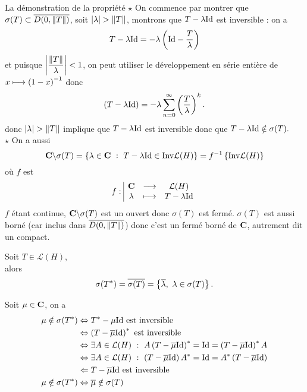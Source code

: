 \documentclass[a4paper,11pt, twoside]{article}
\begin{document}
\begin{ProofC}{La démonstration de la propriété}
  $\star$ On commence par montrer que $\sigma(T)\subset \overline{D(0,\left\lVert T\right\rVert)}$, soit $\abs{\lambda}>\norm{T}$, montrons que $T-\lambda \mathrm{Id}$ est inversible : on a 
  $$T-\lambda\mathrm{Id}=-\lambda\left(\mathrm{Id}-\frac{T}{\lambda}\right)$$
  et puisque $\displaystyle\left| \frac{\left\lVert T\right\rVert}{\lambda}\right|<1$, on peut utiliser le développement en série entière de $\displaystyle x\longmapsto\left(1-x\right)^{-1}$
  donc 
  $$\left(T-\lambda\mathrm{Id}\right)=-\lambda\sum_{n=0}^\infty\left(\frac{T}{\lambda}\right)^k.$$
  donc $\abs{\lambda}>\norm{T}$ implique que $T-\lambda \mathrm{Id}$ est inversible donc que $T-\lambda\mathrm{Id}\notin\sigma(T).$\\

  $\star$ On a aussi 
  $$\C\backslash\sigma(T)=\ens{\lambda\in\C\ :\ T-\lambda\Id\in\mathrm{Inv}\mathcal L(H)}=f^{-1}\ens{\mathrm{Inv}\mathcal L(H)}$$
  où $f$ est 
  $$f:\begin{array}{|ccc}
    \mathbf C&\longrightarrow&\mathcal L(H)\\
    \lambda&\longmapsto&T-\lambda\mathrm{Id}
  \end{array}$$
  $f$ étant continue, $\mathbf C\backslash\sigma(T)$ est un ouvert donc $\sigma(T)$ est fermé. $\sigma(T)$ est aussi borné (car inclus dans $\overline{D(0,\left\lVert T\right\rVert)}$) donc c'est un fermé borné de $\mathbf C$, autrement dit un compact.
\end{ProofC}


\begin{prop}
  Soit $T\in\mathcal L(H)$,\\

  alors 
  $$\sigma(T^*)=\overline{\sigma(T)}=\ens{\overline{\lambda},\ \lambda\in\sigma(T)}.$$
\end{prop}


\begin{Proof}
  Soit $\mu\in \mathbf C$, on a 
  \begin{align*}
    \mu\notin\sigma(T^*)&\Leftrightarrow T^*-\mu\Id\text{ est inversible}\\
    &\Leftrightarrow \Par{T-\overline\mu\Id}^*\text{ est inversible}\\
    &\Leftrightarrow\exists A\in\mathcal L(H)\ : \ A\Par{T-\overline\mu\Id}^*=\Id=\Par{T-\overline\mu\Id}^*A\\
    &\Leftrightarrow\exists A\in\mathcal L(H)\ : \ \Par{T-\overline\mu\Id}A^*=\Id=A^*\Par{T-\overline\mu\Id}\\
    &\Leftarrow T-\overline\mu\Id\text{ est inversible}\\
    \mu\notin\sigma(T^*)&\Leftrightarrow\overline{\mu}\notin\sigma(T)
  \end{align*}
\end{Proof}
\end{document}
